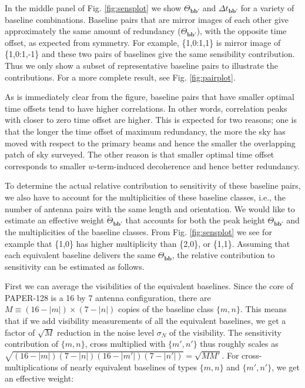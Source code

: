 \documentclass[twocolumn,apj,numberedappendix]{emulateapj}
\renewcommand\[{\begin{equation}}
\renewcommand\]{\end{equation}}
\begin{document}
In the middle panel of Fig. \ref{fig:sensplot}
we show $\Theta_{\boldsymbol{bb'}}$ and $\Delta t_{\boldsymbol{bb'}}$ for a variety of baseline combinations. Baseline pairs that are mirror images of each other 
give approximately the same amount of redundancy ($\Theta_{\boldsymbol{bb'}}$), with the opposite time offset, as expected from symmetry. 
For example, \{1,0:1,1\} is mirror image of \{1,0:1,-1\} and these two pairs of baselines
give the same sensibility contribution. Thus we only show a subset of representative baseline pairs to illustrate the contributions. For a more complete result, see Fig. \ref{fig:pairplot}.  

As is immediately clear from the figure, baseline pairs that have smaller optimal time offsets
tend to have higher correlations. In other words, correlation peaks
with closer to zero time offset are higher. This is expected for two reasons;
one is that the longer the time offset of maximum redundancy, the more the sky has moved with respect
to the primary beams and hence the smaller the overlapping patch of sky surveyed. The other reason is that smaller optimal
time offset corresponds to smaller $w$-term-induced decoherence and hence better redundancy. 


To determine the actual relative contribution to sensitivity of these
baseline pairs, we also have to account for the multiplicities of
these baseline classes, i.e., the number of antenna pairs with the
same length and orientation. We would like to estimate an effective weight $\widetilde{\Theta}_{\boldsymbol{bb'}}$ that accounts for both the peak height $\Theta_{\boldsymbol{bb'}}$ and the multiplicities of the baseline classes. From Fig. \ref{fig:sensplot}
we see for example that \{1,0\} has higher multiplicity than \{2,0\},
or \{1,1\}. Assuming that each equivalent baseline delivers
the same $\Theta_{\boldsymbol{bb}}$, the relative contribution to sensitivity can be estimated as follows. 

First we can average the visibilities of the equivalent baselines. Since the core of PAPER-128 is a 16 by 7 antenna configuration, there
are $M\equiv(16-|m|)\times(7-|n|)$ copies of the baseline class $\{m,n\}$. This means
that if we add visibility measurements of all the equivalent baselines,
we get a factor of $\sqrt{M}$ reduction in the noise
level $\sigma_N$ of the visibility. The sensitivity contribution of $\{m,n\}$, cross multiplied with $\{m',n'\}$  thus roughly scales as $\sqrt{(16-|m|)(7-|n|)(16-|m'|)(7-|n'|)}=\sqrt{MM'}$.
For cross-multiplications of nearly equivalent baselines of
types $\{m,n\}$ and $\{m',n'\}$, we get an effective weight: 
\end{document}
